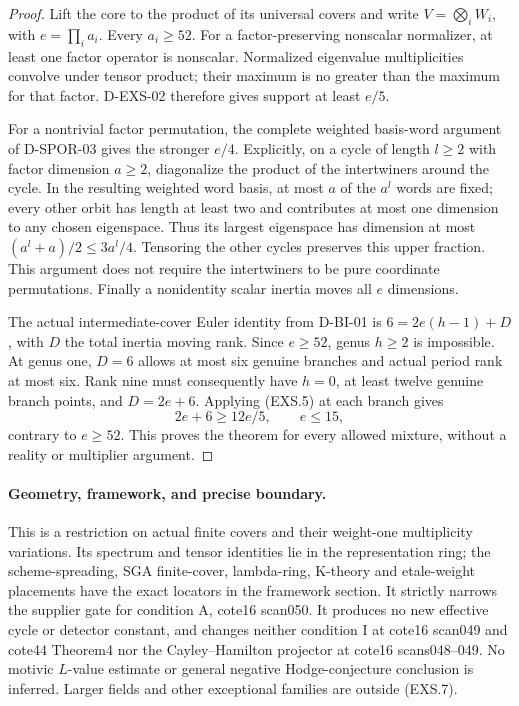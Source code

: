 \begin{proof}
Lift the core to the product of its universal covers and write
$V=\bigotimes_i W_i$, with $e=\prod_i a_i$. Every $a_i\ge52$.
For a factor-preserving nonscalar normalizer, at least one factor
operator is nonscalar. Normalized eigenvalue multiplicities convolve
under tensor product; their maximum is no greater than the maximum
for that factor. D-EXS-02 therefore gives support at least $e/5$.

For a nontrivial factor permutation, the complete weighted basis-word
argument of D-SPOR-03 gives the stronger $e/4$. Explicitly, on a
cycle of length $l\ge2$ with factor dimension $a\ge2$, diagonalize
the product of the intertwiners around the cycle. In the resulting
weighted word basis, at most $a$ of the $a^l$ words are fixed;
every other orbit has length at least two and contributes at most
one dimension to any chosen eigenspace. Thus its largest eigenspace
has dimension at most $(a^l+a)/2\le3a^l/4$. Tensoring the other
cycles preserves this upper fraction. This argument does not require
the intertwiners to be pure coordinate permutations. Finally a
nonidentity scalar inertia moves all $e$ dimensions.

The actual intermediate-cover Euler identity from D-BI-01 is
$6=2e(h-1)+D$, with $D$ the total inertia moving rank. Since
$e\ge52$, genus $h\ge2$ is impossible. At genus one, $D=6$
allows at most six genuine branches and actual period rank at most
six. Rank nine must consequently have $h=0$, at least twelve
genuine branch points, and $D=2e+6$. Applying (EXS.5) at each
branch gives
\[
                 2e+6\ge12e/5,\qquad e\le15,                 \tag{EXS.8}
\]
contrary to $e\ge52$. This proves the theorem for every allowed
mixture, without a reality or multiplier argument.
\end{proof}

\paragraph{Geometry, framework, and precise boundary.}
This is a restriction on actual finite covers and their weight-one
multiplicity variations. Its spectrum and tensor identities lie in
the representation ring; the scheme-spreading, SGA finite-cover,
lambda-ring, K-theory and etale-weight placements have the exact
locators in the framework section. It strictly narrows the supplier
gate for condition A, cote16 scan050. It produces no new effective
cycle or detector constant, and changes neither condition I at
cote16 scan049 and cote44 Theorem4 nor the Cayley--Hamilton projector
at cote16 scans048--049. No motivic $L$-value estimate or general
negative Hodge-conjecture conclusion is inferred. Larger fields and
other exceptional families are outside (EXS.7).
